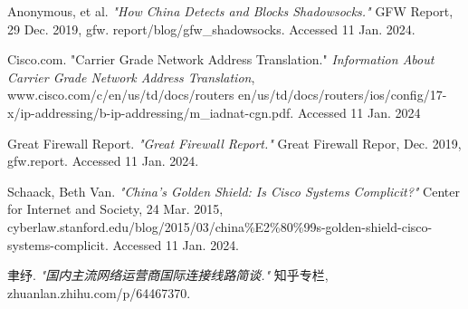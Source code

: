 \documentclass[11pt]{article}
\begin{document}
\newpage

\begin{thebibliography}{9}
 Anonymous, et al. \textit{"How China Detects
and Blocks Shadowsocks."} GFW Report, 29 Dec. 2019, gfw.
report/blog/gfw\_shadowsocks. Accessed 11 Jan. 2024.

	 Cisco.com. "Carrier Grade Network Address Translation."
	\textit{Information About Carrier Grade Network Address Translation}, www.cisco.com/c/en/us/td/docs/routers
	en/us/td/docs/routers/ios/config/17-x/ip-addressing/b-ip-addressing/m\_iadnat-cgn.pdf. Accessed 11 Jan. 2024

	 Great Firewall Report. \textit{"Great Firewall Report."}
	Great Firewall Repor, Dec. 2019, gfw.report. Accessed 11 Jan. 2024.

	Schaack, Beth Van. \textit{"China's Golden Shield: Is Cisco Systems Complicit?"} Center
	for Internet and Society, 24 Mar. 2015, cyberlaw.stanford.edu/blog/2015/03/china\%E2\%80\%99s-golden-shield-cisco-systems-complicit.
	Accessed 11 Jan. 2024.

	聿纾. \textit{"国内主流网络运营商国际连接线路简谈."} 知乎专栏, zhuanlan.zhihu.com/p/64467370.

\end{thebibliography}
\end{document}

